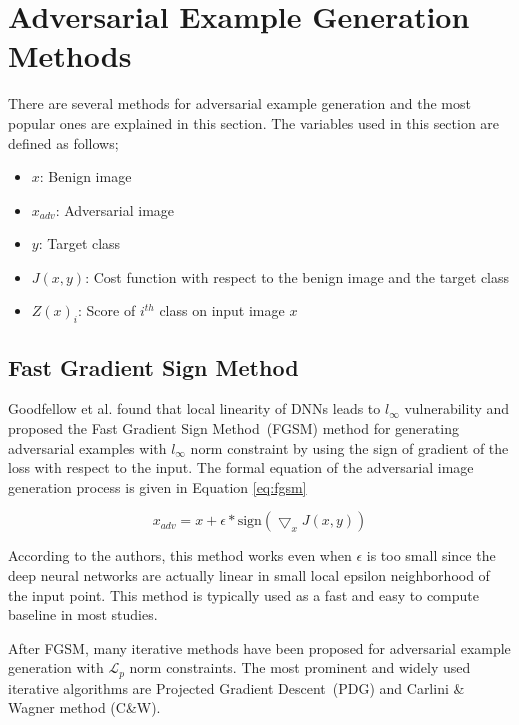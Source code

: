 \section{Adversarial Example Generation Methods}\label{section:methods}
There are several methods for adversarial example generation and the most popular ones are explained in this section. The variables used in this section are defined as follows;
\begin{itemize}
    \setlength\itemsep{0em}
    \item \(x\): Benign image
    \item \(x_{adv}\): Adversarial image
    \item \(y\): Target class
    \item \(J(x, y)\): Cost function with respect to the benign image and the target class
    \item \(Z(x)_i\): Score of $i^{th}$ class on input image \(x\)
\end{itemize}

\subsection{Fast Gradient Sign Method}

Goodfellow et al. found that local linearity of DNNs leads to \(l_\infty\) vulnerability \cite{goodfellow2014explaining} and proposed the Fast Gradient Sign Method~(FGSM) method for generating adversarial examples with \(l_\infty\) norm constraint by using the sign of gradient of the loss with respect to the input. The formal equation of the adversarial image generation process is given in Equation \ref{eq:fgsm}

\begin{equation}
    \label{eq:fgsm}
    x_{adv} = x + \epsilon * \text{sign}(\bigtriangledown_{x}J(x,y))
\end{equation}

According to the authors, this method works even when \(\epsilon\) is too small since the deep neural networks are actually linear in small local epsilon neighborhood of the input point. This method is typically used as a fast and easy to compute baseline in most studies.

After FGSM, many iterative methods have been proposed for adversarial example generation with \(\mathcal{L}_p\) norm constraints. The most prominent and widely used iterative algorithms are Projected Gradient Descent~(PDG) and Carlini \& Wagner method (C\&W).

